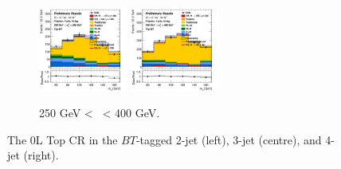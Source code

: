\begin{figure}[h!]
\begin{subfigure}[b]{\textwidth}
        \includegraphics[width=0.32\textwidth]{Images/VH/Own_fit/postfit_VHcc/Region_distmBB_BMax400_BMin250_DtopCRBC_J3_TTypebt_T1_L0_Y6051_GlobalFit_conditionnal_mu1.png}
        \includegraphics[width=0.32\textwidth]{Images/VH/Own_fit/postfit_VHbb/Region_distmBB_BMax400_BMin250_DtopCRBC_J4_TTypebt_T1_L0_Y6051_GlobalFit_conditionnal_mu1.png} %
        \caption{250 GeV < \ptv\ < 400 GeV.}
        \label{fig:plots_VHcc_OL_250_TopCR_2c}
    \end{subfigure}
    \caption{The 0L Top CR in the $BT$-tagged 2-jet (left), 3-jet (centre), and 4-jet (right).}
    \label{fig:plots_VHcc_OL_TopCR_2c}
\end{figure} 

\vspace*{\fill} \newpage
\vspace*{\fill} 

